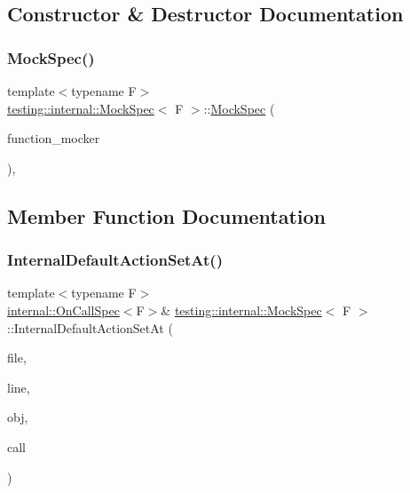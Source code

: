 \subsection{Constructor \& Destructor Documentation}
\mbox{\label{classtesting_1_1internal_1_1_mock_spec_a067fe3d12433cec0aa63f396f4f55fa9}} 
\subsubsection{\texorpdfstring{Mock\+Spec()}{MockSpec()}}
{\footnotesize\ttfamily template$<$typename F$>$ \\
\hyperlink{classtesting_1_1internal_1_1_mock_spec}{testing\+::internal\+::\+Mock\+Spec}$<$ F $>$\+::\hyperlink{classtesting_1_1internal_1_1_mock_spec}{Mock\+Spec} (\begin{DoxyParamCaption}\item[{\hyperlink{classtesting_1_1internal_1_1_function_mocker_base}{internal\+::\+Function\+Mocker\+Base}$<$ F $>$ $\ast$}]{function\+\_\+mocker }\end{DoxyParamCaption})\hspace{0.3cm}{\ttfamily [inline]}, {\ttfamily [explicit]}}



\subsection{Member Function Documentation}
\mbox{\label{classtesting_1_1internal_1_1_mock_spec_a875c99443da1265604d87429693457f4}} 
\subsubsection{\texorpdfstring{Internal\+Default\+Action\+Set\+At()}{InternalDefaultActionSetAt()}}
{\footnotesize\ttfamily template$<$typename F$>$ \\
\hyperlink{classtesting_1_1internal_1_1_on_call_spec}{internal\+::\+On\+Call\+Spec}$<$F$>$\& \hyperlink{classtesting_1_1internal_1_1_mock_spec}{testing\+::internal\+::\+Mock\+Spec}$<$ F $>$\+::Internal\+Default\+Action\+Set\+At (\begin{DoxyParamCaption}\item[{const char $\ast$}]{file,  }\item[{int}]{line,  }\item[{const char $\ast$}]{obj,  }\item[{const char $\ast$}]{call }\end{DoxyParamCaption})\hspace{0.3cm}{\ttfamily [inline]}}

